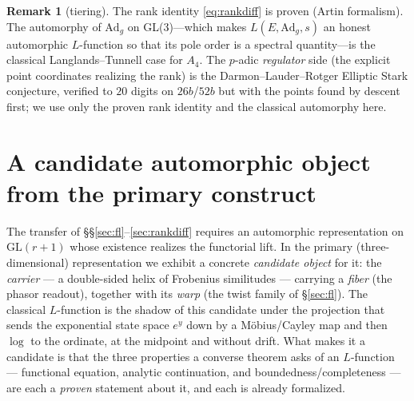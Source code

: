 \documentclass[11pt]{article}
\theoremstyle{definition}
\newtheorem{remark}[theorem]{Remark}
\begin{document}
\begin{remark}[tiering]
The rank identity \eqref{eq:rankdiff} is proven (Artin formalism). The automorphy of $\mathrm{Ad}_g$
on GL(3)---which makes $L(E,\mathrm{Ad}_g,s)$ an honest automorphic $L$-function so that its pole order
is a spectral quantity---is the classical Langlands--Tunnell case for $A_4$. The $p$-adic
\emph{regulator} side (the explicit point coordinates realizing the rank) is the Darmon--Lauder--Rotger
Elliptic Stark conjecture, verified to $20$ digits on $26b$/$52b$ but with the points found by
descent first; we use only the proven rank identity and the classical automorphy here.
\end{remark}

\section{A candidate automorphic object from the primary construct}\label{sec:construct}

The transfer of \S\S\ref{sec:fl}--\ref{sec:rankdiff} requires an automorphic representation on
$\mathrm{GL}(r+1)$ whose existence realizes the functorial lift. In the primary (three-dimensional)
representation we exhibit a concrete \emph{candidate object} for it: the \emph{carrier} --- a
double-sided helix of Frobenius similitudes --- carrying a \emph{fiber} (the phasor readout), together
with its \emph{warp} (the twist family of \S\ref{sec:fl}). The classical $L$-function is the shadow of
this candidate under the projection that sends the exponential state space $e^{y}$ down by a
M\"obius/Cayley map and then $\log$ to the ordinate, at the midpoint and without drift. What makes it
a candidate is that the three properties a converse theorem asks of an $L$-function --- functional
equation, analytic continuation, and boundedness/completeness --- are each a \emph{proven} statement
about it, and each is already formalized.
\end{document}
